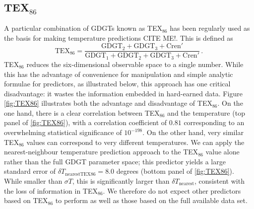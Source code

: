 \documentclass[rmp,aps,twocolumn]{revtex4-1}
\newcommand{\citeme}{{\color{blue} CITE ME!}}
\def\be{\begin{equation}}
\def\ee{\end{equation}}
\begin{document}
\subsection{TEX$_{86}$}

A particular combination of GDGTs known as TEX$_{86}$ has been regularly used as the basis for making temperature predictions \citeme.  This is defined as 
\be\label{eq:TEX86}
\mathrm{TEX}_{86} = \frac{\mathrm{GDGT}_2+\mathrm{GDGT}_3+\mathrm{Cren}'}{\mathrm{GDGT}_1+\mathrm{GDGT}_2+\mathrm{GDGT}_3+\mathrm{Cren}'}\, .
\ee
TEX$_{86}$ reduces the six-dimensional observable space to a single number.  While this has the advantage of convenience for manipulation and simple analytic formulae for predictors, as illustrated below, this approach has one critical disadvantage: it wastes the information embedded in hard-earned data.  Figure \ref{fig:TEX86} illustrates both the advantage and disadvantage of TEX$_{86}$.  On the one hand, there is a clear correlation between TEX$_{86}$ and the temperature (top panel of \autoref{fig:TEX86}), with a correlation coefficient of $0.81$ corresponding to an overwhelming statistical significance of $10^{-198}$.  On the other hand, very similar TEX$_{86}$ values can correspond to very different temperatures.  We can apply the nearest-neighbour temperature prediction approach to the TEX$_{86}$ value alone rather than the full GDGT parameter space; this predictor yields a large standard error of $\delta T_\mathrm{nearest TEX86} = 8.0$ degrees (bottom panel of \autoref{fig:TEX86}).  While smaller than $\sigma T$, this is significantly larger than $\delta T_\mathrm{nearest}$, consistent with the loss of information in TEX$_{86}$.  We therefore do not expect other predictors based on TEX$_{86}$ to perform as well as those based on the full available data set.
\end{document}
